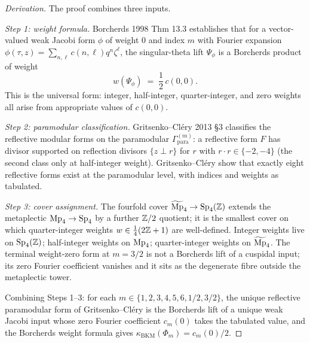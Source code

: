 \begin{proof}[Derivation]
The proof combines three inputs.

\smallskip\noindent
\emph{Step 1: weight formula.} Borcherds 1998 Thm 13.3 establishes
that for a vector-valued weak Jacobi form $\phi$ of weight $0$ and
index $m$ with Fourier expansion $\phi(\tau, z) = \sum_{n, \ell} c(n, \ell) q^n \zeta^\ell$,
the singular-theta lift $\Psi_\phi$ is a Borcherds product of weight
\[
  w(\Psi_\phi) \;=\; \frac{1}{2}\, c(0, 0).
\]
This is the universal form: integer, half-integer, quarter-integer,
and zero weights all arise from appropriate values of $c(0, 0)$.

\smallskip\noindent
\emph{Step 2: paramodular classification.} Gritsenko--Cl\'ery 2013
\S3 classifies the reflective modular forms on the paramodular
$\Gamma_{\mathrm{para}}^{(m)}$: a reflective form $F$ has divisor
supported on reflection divisors $\{z \perp r\}$ for $r$ with
$r \cdot r \in \{-2, -4\}$ (the second class only at half-integer
weight). Gritsenko--Cl\'ery show that exactly eight reflective
forms exist at the paramodular level, with
indices and weights as tabulated.

\smallskip\noindent
\emph{Step 3: cover assignment.} The fourfold cover
$\widetilde{\mathrm{Mp}}_4 \to \mathrm{Sp}_4(\mathbb{Z})$ extends the metaplectic $\mathrm{Mp}_4 \to \mathrm{Sp}_4$
by a further $\mathbb{Z}/2$ quotient; it is the smallest cover on which
quarter-integer weights $w \in \frac{1}{4}(2\mathbb{Z} + 1)$ are
well-defined. Integer weights live on $\mathrm{Sp}_4(\mathbb{Z})$; half-integer
weights on $\mathrm{Mp}_4$; quarter-integer weights on $\widetilde{\mathrm{Mp}}_4$. The
terminal weight-zero form at $m = 3/2$ is not a Borcherds lift of
a cuspidal input; its zero Fourier coefficient vanishes and it sits
as the degenerate fibre outside the metaplectic tower.

\smallskip
Combining Steps 1--3: for each $m \in \{1, 2, 3, 4, 5, 6, 1/2, 3/2\}$,
the unique reflective paramodular form of Gritsenko--Cl\'ery is the
Borcherds lift of a unique weak Jacobi input whose zero Fourier
coefficient $c_m(0)$ takes the tabulated value, and the Borcherds
weight formula gives $\kappa_{\mathrm{BKM}}(\Phi_m) = c_m(0)/2$.
\end{proof}

